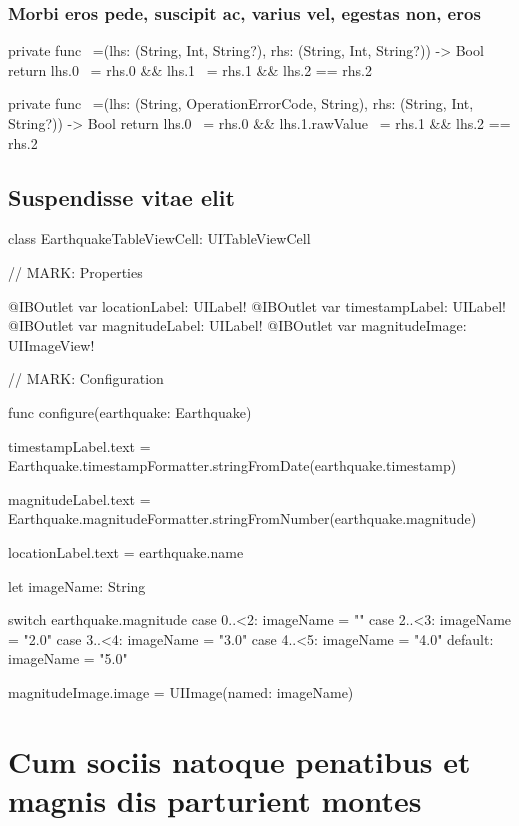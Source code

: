\documentclass[10pt]{extarticle}
\begin{document}
\subsubsection{Morbi eros pede, suscipit ac, varius vel, egestas non, eros}

\begin{swiftlisting}
private func ~=(lhs: (String, Int, String?), rhs: (String, Int, String?)) -> Bool {
    return lhs.0 ~= rhs.0 && lhs.1 ~= rhs.1 && lhs.2 == rhs.2
}

private func ~=(lhs: (String, OperationErrorCode, String), rhs: (String, Int, String?)) -> Bool {
    return lhs.0 ~= rhs.0 && lhs.1.rawValue ~= rhs.1 && lhs.2 == rhs.2
}
\end{swiftlisting}

\subsection{Suspendisse vitae elit}

\lipsum[10]

\begin{swiftlisting}
class EarthquakeTableViewCell: UITableViewCell {
    // MARK: Properties

    @IBOutlet var locationLabel: UILabel!
    @IBOutlet var timestampLabel: UILabel!
    @IBOutlet var magnitudeLabel: UILabel!
    @IBOutlet var magnitudeImage: UIImageView!
    
    // MARK: Configuration
    
    func configure(earthquake: Earthquake) {
        timestampLabel.text = Earthquake.timestampFormatter.stringFromDate(earthquake.timestamp)

        magnitudeLabel.text = Earthquake.magnitudeFormatter.stringFromNumber(earthquake.magnitude)
        
        locationLabel.text = earthquake.name
        
        let imageName: String
        
        switch earthquake.magnitude {
            case 0..<2: imageName = ""
            case 2..<3: imageName = "2.0"
            case 3..<4: imageName = "3.0"
            case 4..<5: imageName = "4.0"
            default:    imageName = "5.0"
        }

        magnitudeImage.image = UIImage(named: imageName)
    }
}
\end{swiftlisting}

\lipsum[11]


\section{Cum sociis natoque penatibus et magnis dis parturient montes}
\end{document}
